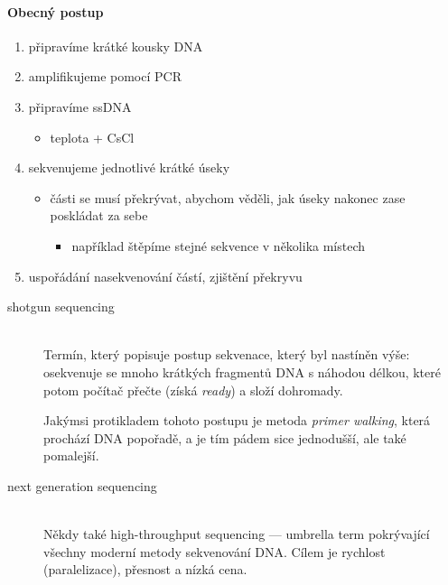 \documentclass[DIV=8]{scrreprt}
\begin{document}
\paragraph{Obecný postup}
\begin{enumerate}[nosep]
    \item připravíme krátké kousky DNA
    \item amplifikujeme pomocí PCR
    \item připravíme ssDNA
\begin{itemize}[nosep]
    \item teplota + CsCl
\end{itemize}

    \item sekvenujeme jednotlivé krátké úseky
\begin{itemize}[nosep]
    \item části se musí překrývat, abychom věděli, jak úseky nakonec zase poskládat za sebe
\begin{itemize}[nosep]
    \item například štěpíme stejné sekvence v několika místech
\end{itemize}

\end{itemize}

    \item uspořádání nasekvenování částí, zjištění překryvu
\end{enumerate}



\begin{description}
\item[shotgun sequencing]\hfill \\
Termín, který popisuje postup sekvenace, který byl nastíněn výše: osekvenuje se mnoho krátkých fragmentů DNA s náhodou délkou, které potom počítač přečte (získá \emph{ready}) a složí dohromady.

Jakýmsi protikladem tohoto postupu je metoda \emph{primer walking}, která prochází DNA popořadě, a je tím pádem sice jednodušší, ale také pomalejší.


\item[next generation sequencing]\hfill \\
Někdy také high-throughput sequencing --- umbrella term pokrývající všechny moderní metody sekvenování DNA. Cílem je rychlost (paralelizace), přesnost a nízká cena.

\end{description}
\end{document}
